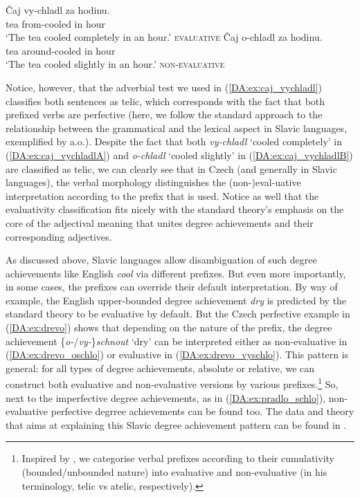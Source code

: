 \documentclass[output=paper]{langscibook}
\begin{document}
\ea\label{DA:ex:caj_vychladl}\ea\label{DA:ex:caj_vychladlA} \gll Čaj vy-chladl za hodinu. \\ 
tea from-cooled in hour \\
\glt ‘The tea cooled completely in an hour.’ \hfill \textsc{evaluative}
\ex\label{DA:ex:caj_vychladlB} \gll Čaj o-chladl za hodinu. \\ 
tea around-cooled in hour \\
\glt ‘The tea cooled slightly in an hour.’ \hfill \textsc{non-evaluative}
\z\z 

\noindent Notice, however, that the adverbial test we used in (\ref{DA:ex:caj_vychladl}) classifies both sentences as telic, which corresponds with the fact that both prefixed verbs are perfective (here, we follow the standard approach to the relationship between the grammatical and the lexical aspect in Slavic languages, exemplified by \citealt{brecht1985form} a.o.). Despite the fact that both \textit{vy-chladl} `cooled completely' in (\ref{DA:ex:caj_vychladlA}) and \textit{o-chladl} `cooled slightly' in (\ref{DA:ex:caj_vychladlB}) are classified as telic, we can clearly see that in Czech (and generally in Slavic languages), the verbal morphology distinguishes the (non-)eval-\linebreak[4]uative interpretation according to the prefix that is used. Notice as well that the evaluativity classification fits nicely with the standard theory's \citep{kennedy2008measure,kennedy_2012} emphasis on the core of the adjectival meaning that unites degree achievements and their corresponding adjectives.

As discussed above, Slavic languages allow disambiguation of such degree achievements like English \textit{cool} via different prefixes. But even more importantly, in some cases, the prefixes can override their default interpretation. By way of example, the English upper-bounded degree achievement \textit{dry} is predicted by the standard theory to be evaluative by default. But the Czech perfective example in (\ref{DA:ex:drevo}) shows that depending on the nature of the prefix, the degree achievement \{\textit{o-}/\textit{vy-}\}\textit{schnout} `dry' can be interpreted either as non-evaluative in (\ref{DA:ex:drevo_oschlo}) or evaluative in (\ref{DA:ex:drevo_vyschlo}). This pattern is general: for all types of degree achievements, absolute or relative, we can construct both evaluative and non-evaluative versions by various prefixes.\footnote{Inspired by \citet{zwarts2005prepositional}, we categorise verbal prefixes according to their cumulativity (bounded\slash unbounded nature) into evaluative and non-evaluative (in his terminology, telic vs atelic, respectively).} So, next to the imperfective degree achievements, as in (\ref{DA:ex:pradlo_schlo}), non-evaluative perfective degrree achievements can be found too. The data and theory that aims at explaining this Slavic degree achievement pattern can be found in \citet{DocekalVlaskova2021}.
\end{document}
